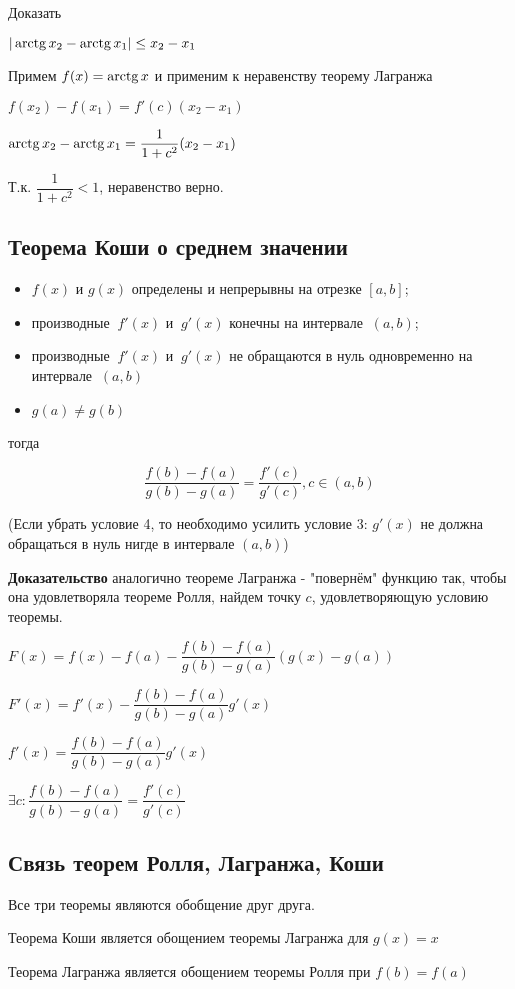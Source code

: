Доказать

$ | \operatorname{arctg} x_2 - \operatorname{arctg} x_1| \le x_2 - x_1 $

Примем $ f(x) = \operatorname{arctg} x $ и применим к неравенству теорему Лагранжа

$ f(x_2)-f(x_1) = f'(c)(x_2-x_1) $

$ \operatorname{arctg} x_2 - \operatorname{arctg} x_1 =  \dfrac{1}{1 + c^{2}}(x_2 - x_1) $

Т.к. $ \dfrac{1}{1 + c^{2}} < 1 $, неравенство верно.

\subsection{Теорема Коши о среднем значении}

\begin{itemize}
\item 
$f(x)$ и $g(x)$ определены и непрерывны на отрезке $[a,b]$;

\item 
производные $\ f'(x)$ и $\ g'(x)$ конечны на интервале $\ (a,b)$;

\item 
производные $\ f'(x)$ и $\ g'(x)$ не обращаются в нуль одновременно на интервале $\ (a,b)$

\item 
$g(a) \neq g(b)$
\end{itemize}

тогда

$$
\frac{f(b)-f(a)}{g(b)-g(a)}=\frac{f'(c)}{g'(c)}, c \in (a,b)
$$

(Если убрать условие 4, то необходимо усилить условие 3: $ g'(x) $ не должна обращаться в нуль нигде в интервале $(a,b)$)

\textbf{Доказательство} аналогично теореме Лагранжа - "повернём" функцию так, чтобы она удовлетворяла теореме Ролля,
найдем точку $ c $, удовлетворяющую условию теоремы.

$ F(x) = f(x) - f(a) - \dfrac{f(b)-f(a)}{g(b)-g(a)}(g(x)-g(a)) $

$ F'(x) = f'(x) - \dfrac{f(b)-f(a)}{g(b)-g(a)}g'(x) $

$ f'(x) = \dfrac{f(b)-f(a)}{g(b)-g(a)}g'(x) $

$ \exists c: \dfrac{f(b)-f(a)}{g(b)-g(a)}=\dfrac{f'(c)}{g'(c)} $



\subsection{Связь теорем Ролля, Лагранжа, Коши}

Все три теоремы являются обобщение друг друга.

Теорема Коши является обощением теоремы Лагранжа для $ g(x) = x $

Теорема Лагранжа является обощением теоремы Ролля при $ f(b) = f(a) $